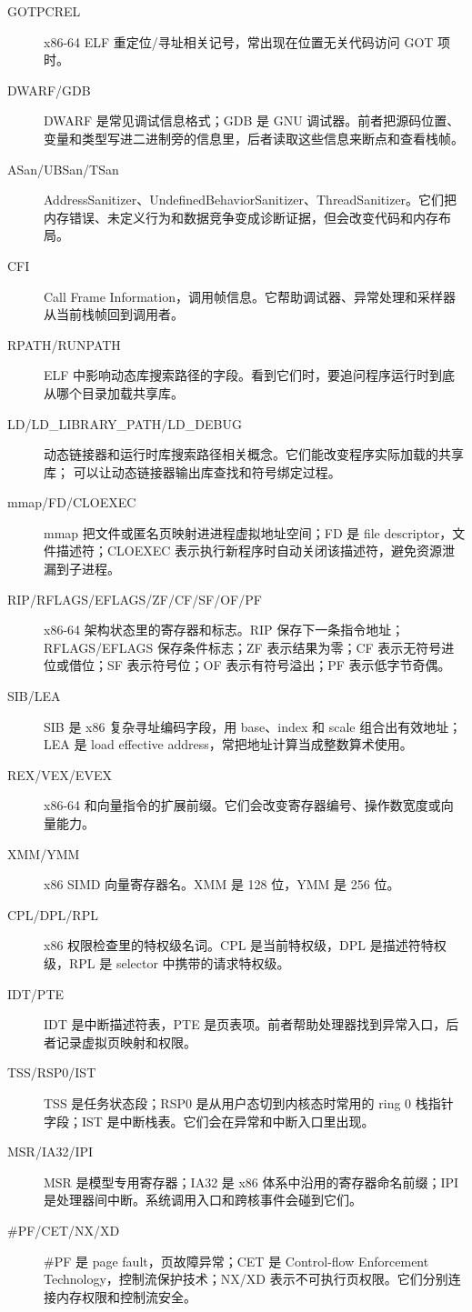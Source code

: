 \begin{description}
  \item[GOTPCREL] x86-64 ELF 重定位/寻址相关记号，常出现在位置无关代码访问 GOT 项时。
  \item[DWARF/GDB] DWARF 是常见调试信息格式；GDB 是 GNU 调试器。前者把源码位置、变量和类型写进二进制旁的信息里，后者读取这些信息来断点和查看栈帧。
  \item[ASan/UBSan/TSan] AddressSanitizer、UndefinedBehaviorSanitizer、ThreadSanitizer。它们把内存错误、未定义行为和数据竞争变成诊断证据，但会改变代码和内存布局。
  \item[CFI] Call Frame Information，调用帧信息。它帮助调试器、异常处理和采样器从当前栈帧回到调用者。
  \item[RPATH/RUNPATH] ELF 中影响动态库搜索路径的字段。看到它们时，要追问程序运行时到底从哪个目录加载共享库。
  \item[LD/LD\_LIBRARY\_PATH/LD\_DEBUG] 动态链接器和运行时库搜索路径相关概念。它们能改变程序实际加载的共享库； 可以让动态链接器输出库查找和符号绑定过程。
  \item[mmap/FD/CLOEXEC] mmap 把文件或匿名页映射进进程虚拟地址空间；FD 是 file descriptor，文件描述符；CLOEXEC 表示执行新程序时自动关闭该描述符，避免资源泄漏到子进程。
  \item[RIP/RFLAGS/EFLAGS/ZF/CF/SF/OF/PF] x86-64 架构状态里的寄存器和标志。RIP 保存下一条指令地址；RFLAGS/EFLAGS 保存条件标志；ZF 表示结果为零；CF 表示无符号进位或借位；SF 表示符号位；OF 表示有符号溢出；PF 表示低字节奇偶。
  \item[SIB/LEA] SIB 是 x86 复杂寻址编码字段，用 base、index 和 scale 组合出有效地址；LEA 是 load effective address，常把地址计算当成整数算术使用。
  \item[REX/VEX/EVEX] x86-64 和向量指令的扩展前缀。它们会改变寄存器编号、操作数宽度或向量能力。
  \item[XMM/YMM] x86 SIMD 向量寄存器名。XMM 是 128 位，YMM 是 256 位。
  \item[CPL/DPL/RPL] x86 权限检查里的特权级名词。CPL 是当前特权级，DPL 是描述符特权级，RPL 是 selector 中携带的请求特权级。
  \item[IDT/PTE] IDT 是中断描述符表，PTE 是页表项。前者帮助处理器找到异常入口，后者记录虚拟页映射和权限。
  \item[TSS/RSP0/IST] TSS 是任务状态段；RSP0 是从用户态切到内核态时常用的 ring 0 栈指针字段；IST 是中断栈表。它们会在异常和中断入口里出现。
  \item[MSR/IA32/IPI] MSR 是模型专用寄存器；IA32 是 x86 体系中沿用的寄存器命名前缀；IPI 是处理器间中断。系统调用入口和跨核事件会碰到它们。
  \item[\#PF/CET/NX/XD] \#PF 是 page fault，页故障异常；CET 是 Control-flow Enforcement Technology，控制流保护技术；NX/XD 表示不可执行页权限。它们分别连接内存权限和控制流安全。

\end{description}
